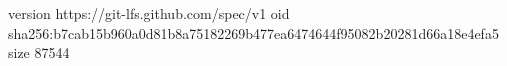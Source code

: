 version https://git-lfs.github.com/spec/v1
oid sha256:b7cab15b960a0d81b8a75182269b477ea6474644f95082b20281d66a18e4efa5
size 87544

